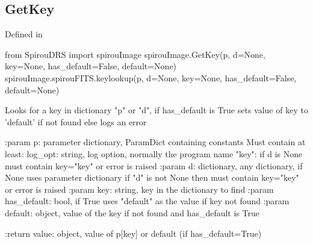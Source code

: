 \noindent\begin{minipage}{\textwidth}
\subsection{GetKey}

Defined in \spirouImage{}

\begin{pythonbox}
from SpirouDRS import spirouImage
spirouImage.GetKey(p, d=None, key=None, has_default=False, default=None)
spirouImage.spirouFITS.keylookup(p, d=None, key=None, has_default=False, default=None)
\end{pythonbox}

\begin{pythondocstring}
Looks for a key in dictionary "p" or "d", if has_default is True sets
value of key to 'default' if not found else logs an error

:param p: parameter dictionary, ParamDict containing constants
    Must contain at least:
            log_opt: string, log option, normally the program name
            "key": if d is None must contain key="key" or error is raised
:param d: dictionary, any dictionary, if None uses parameter dictionary
          if "d" is not None then must contain key="key" or error is raised
:param key: string, key in the dictionary to find
:param has_default: bool, if True uses "default" as the value if key
                    not found
:param default: object, value of the key if not found and
                has_default is True

:return value: object, value of p[key] or default (if has_default=True)
\end{pythondocstring}
\end{minipage}



